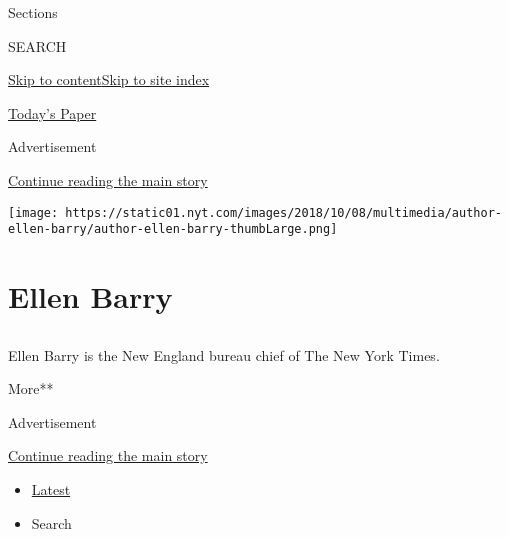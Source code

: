 Sections

SEARCH

\protect\hyperlink{site-content}{Skip to
content}\protect\hyperlink{site-index}{Skip to site index}

\href{https://myaccount.nytimes.com/auth/login?response_type=cookie\&client_id=vi}{}

\href{https://www.nytimes.com/section/todayspaper}{Today's Paper}

Advertisement

\protect\hyperlink{after-top}{Continue reading the main story}

\texttt{[image: https://static01.nyt.com/images/2018/10/08/multimedia/author-ellen-barry/author-ellen-barry-thumbLarge.png]}

\hypertarget{ellen-barry}{%
\section{Ellen Barry}\label{ellen-barry}}

\subsection{}

Ellen Barry is the New England bureau chief of The New York Times.

More**

Advertisement

\protect\hyperlink{after-mid1}{Continue reading the main story}

\begin{itemize}
\tightlist
\item
  \protect\hyperlink{stream-panel}{Latest}
\item
  Search
\end{itemize}

